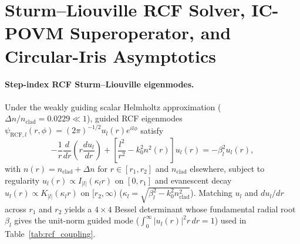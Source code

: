 \documentclass[aps,pra,onecolumn,notitlepage,11pt,tightenlines,nofootinbib,floatfix,longbibliography]{revtex4-2}
\newcommand{\abs}[1]{\lvert #1 \rvert}
\begin{document}
\appendix

\section{Sturm--Liouville RCF Solver, IC-POVM Superoperator, and Circular-Iris Asymptotics}
\label{app:methods}

\paragraph*{Step-index RCF Sturm--Liouville eigenmodes.}
Under the weakly guiding scalar Helmholtz approximation ($\Delta n / n_{\mathrm{clad}} = 0.0229 \ll 1$), guided RCF eigenmodes $\psi_{\mathrm{RCF},l}(r,\phi) = (2\pi)^{-1/2} u_l(r) e^{il\phi}$ satisfy
\begin{equation}
-\frac{1}{r}\frac{d}{dr}\!\left(r\frac{du_l}{dr}\right) + \left[\frac{l^2}{r^2} - k_0^2 n^2(r)\right] u_l(r) = -\beta_l^2 u_l(r),
\label{eq:app_sl_ode}
\end{equation}
with $n(r) = n_{\mathrm{clad}} + \Delta n$ for $r \in [r_1, r_2]$ and $n_{\mathrm{clad}}$ elsewhere, subject to regularity $u_l(r) \propto I_{\abs{l}}(\kappa_l r)$ on $[0,r_1]$ and evanescent decay $u_l(r) \propto K_{\abs{l}}(\kappa_l r)$ on $[r_2,\infty)$ ($\kappa_l = \sqrt{\beta_l^2 - k_0^2 n_{\mathrm{clad}}^2}$). Matching $u_l$ and $du_l/dr$ across $r_1$ and $r_2$ yields a $4\times 4$ Bessel determinant whose fundamental radial root $\beta_l$ gives the unit-norm guided mode ($\int_0^\infty \abs{u_l(r)}^2 r\,dr = 1$) used in Table~\ref{tab:rcf_coupling}.
\end{document}
